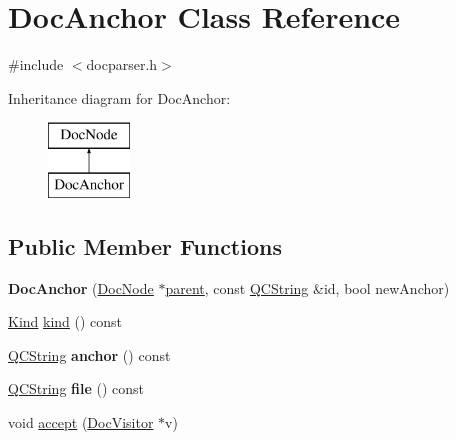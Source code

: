\hypertarget{class_doc_anchor}{}\section{Doc\+Anchor Class Reference}
\label{class_doc_anchor}


{\ttfamily \#include $<$docparser.\+h$>$}

Inheritance diagram for Doc\+Anchor\+:\begin{figure}[H]
\begin{center}
\leavevmode
\includegraphics[height=2.000000cm]{class_doc_anchor}
\end{center}
\end{figure}
\subsection*{Public Member Functions}
\begin{DoxyCompactItemize}
\item 
\mbox{\label{class_doc_anchor_afed6b91bf689b2ecd14b18bf9f62c3b8}} 
{\bfseries Doc\+Anchor} (\mbox{\hyperlink{class_doc_node}{Doc\+Node}} $\ast$\mbox{\hyperlink{class_doc_node_a73e8ad29a91cfceb0968eb00db71a23d}{parent}}, const \mbox{\hyperlink{class_q_c_string}{Q\+C\+String}} \&id, bool new\+Anchor)
\item 
\mbox{\hyperlink{class_doc_node_aebd16e89ca590d84cbd40543ea5faadb}{Kind}} \mbox{\hyperlink{class_doc_anchor_aec825aa865b67f496e610281f2cf1f51}{kind}} () const
\item 
\mbox{\label{class_doc_anchor_aa2b10316da4800824d00ed52d8eee959}} 
\mbox{\hyperlink{class_q_c_string}{Q\+C\+String}} {\bfseries anchor} () const
\item 
\mbox{\label{class_doc_anchor_ae8a62d8e80af9d1cf04561fcbe07c343}} 
\mbox{\hyperlink{class_q_c_string}{Q\+C\+String}} {\bfseries file} () const
\item 
void \mbox{\hyperlink{class_doc_anchor_aab4638b79fb244e363d5d028c7a2cd65}{accept}} (\mbox{\hyperlink{class_doc_visitor}{Doc\+Visitor}} $\ast$v)
\end{DoxyCompactItemize}
